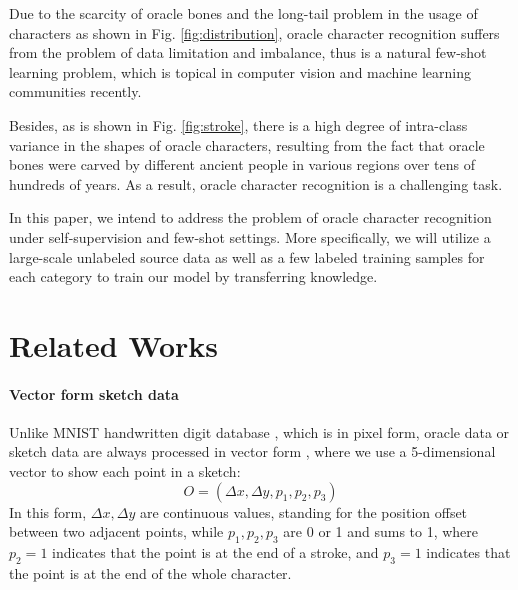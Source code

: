 \documentclass{article}
\begin{document}
Due to the scarcity of oracle bones and the long-tail problem in the usage of characters as shown in Fig. \ref{fig:distribution}, oracle character recognition suffers from the problem of data limitation and imbalance, thus is a natural few-shot learning problem, which is topical in computer vision and machine learning communities recently. 

Besides, as is shown in Fig. \ref{fig:stroke}, there is a high degree of intra-class variance in the shapes of oracle characters, resulting from the fact that oracle bones were carved by different ancient people in various regions over tens of hundreds of years. As a result, oracle character recognition is a challenging task.

In this paper, we intend to address the problem of oracle character recognition under self-supervision and few-shot settings. More specifically, we will utilize a large-scale unlabeled source data as well as a few labeled training samples for each category to train our model by transferring knowledge.

\section{Related Works}
\label{sec:related}

\paragraph{Vector form sketch data}
Unlike MNIST handwritten digit database \citep{MNIST}, which is in pixel form, oracle data or sketch data are always processed  in vector form \citep{Sketch-BERT}, where we use a 5-dimensional vector to show each point in a sketch:
\begin{equation}
	O = (\Delta x, \Delta y, p_1, p_2, p_3)
	\label{equ:vec}
\end{equation}
In this form, $ \Delta x, \Delta y $ are continuous values, standing for the position offset between two adjacent points,
while $ p_1, p_2, p_3 $ are 0 or 1 and sums to 1, 
where $ p_2 = 1 $ indicates that the point is at the end of a stroke, and $ p_3 = 1 $ indicates that the point is at the end of the whole character.
\end{document}

